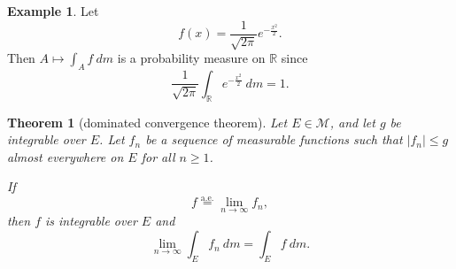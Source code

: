 \documentclass[a4paper,12pt]{scrreprt}
\newcommand{\R}{\mathbb{R}}
\theoremstyle{definition}
\newtheorem{example}{Example}[section]
\theoremstyle{plain}
\newtheorem{theorem}{Theorem}[section]
\theoremstyle{remark}
\begin{document}
\begin{example}
  Let
  \begin{equation*}
    f(x) = \frac{1}{\sqrt{2 \pi}} e^{-\frac{x^{2}}{2}}.
  \end{equation*}
  Then $A \mapsto \int_{A}f\ dm$ is a probability measure on $\R$ since
  \begin{equation*}
    \frac{1}{\sqrt{2\pi}} \int_{\R} e^{-\frac{x^2}{2}}\ dm = 1.
  \end{equation*}
\end{example}

\begin{theorem}[dominated convergence theorem]
  \label{thm:dominatedconvergencetheorem}
  Let $E \in \mathcal{M}$, and let $g$ be integrable over $E$. Let $f_{n}$ be a sequence of measurable functions such that $\left|f_{n}\right| \leq g$ almost everywhere on $E$ for all $n \geq 1$.

  If
  \begin{equation*}
    f \overset{\mathrm{a.e.}}{=} \lim_{n \to \infty} f_{n},
  \end{equation*}
  then $f$ is integrable over $E$ and
  \begin{equation*}
    \lim_{n \to \infty} \int_{E} f_{n}\ dm = \int_{E} f\ dm.
  \end{equation*}
\end{theorem}
\end{document}
